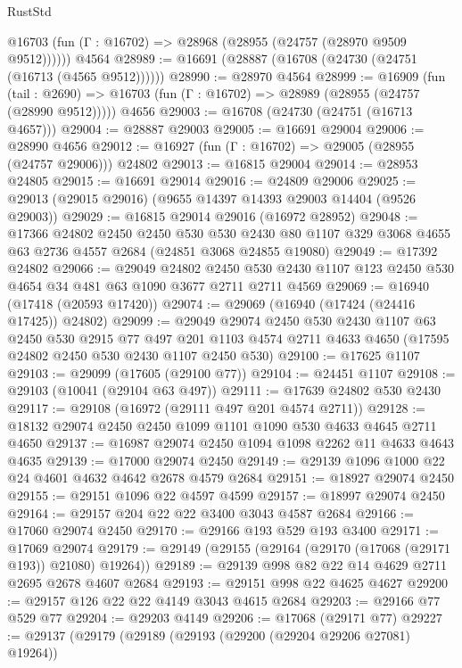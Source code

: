 \begin{lexlean}{RustStd}
\begin{coremodule}
      @16703 (fun (Γ : @16702) => @28968 (@28955 (@24757 (@28970 @9509 @9512))))))
    @4564
@28989 := @16691 (@28887 (@16708 (@24730 (@24751 (@16713 (@4565 @9512))))))
@28990 := @28970 @4564
@28999 := @16909
    (fun (tail : @2690) => @16703 (fun (Γ : @16702) => @28989 (@28955 (@24757 (@28990 @9512)))))
    @4656
@29003 := @16708 (@24730 (@24751 (@16713 @4657)))
@29004 := @28887 @29003
@29005 := @16691 @29004
@29006 := @28990 @4656
@29012 := @16927 (fun (Γ : @16702) => @29005 (@28955 (@24757 @29006))) @24802
@29013 := @16815 @29004
@29014 := @28953 @24805
@29015 := @16691 @29014
@29016 := @24809 @29006
@29025 := @29013 (@29015 @29016) (@9655 @14397 @14393 @29003 @14404 (@9526 @29003))
@29029 := @16815 @29014 @29016 (@16972 @28952)
@29048 := @17366
    @24802
    @2450
    @2450
    @530
    @530
    @2430
    @80
    @1107
    @329
    @3068
    @4655
    @63
    @2736
    @4557
    @2684
    (@24851 @3068 @24855 @19080)
@29049 := @17392 @24802
@29066 := @29049
    @24802
    @2450
    @530
    @2430
    @1107
    @123
    @2450
    @530
    @4654
    @34
    @481
    @63
    @1090
    @3677
    @2711
    @2711
    @4569
@29069 := @16940 (@17418 (@20593 @17420))
@29074 := @29069 (@16940 (@17424 (@24416 @17425)) @24802)
@29099 := @29049
    @29074
    @2450
    @530
    @2430
    @1107
    @63
    @2450
    @530
    @2915
    @77
    @497
    @201
    @1103
    @4574
    @2711
    @4633
    @4650
    (@17595 @24802 @2450 @530 @2430 @1107 @2450 @530)
@29100 := @17625 @1107
@29103 := @29099 (@17605 (@29100 @77))
@29104 := @24451 @1107
@29108 := @29103 (@10041 (@29104 @63 @497))
@29111 := @17639 @24802 @530 @2430
@29117 := @29108 (@16972 (@29111 @497 @201 @4574 @2711))
@29128 := @18132 @29074 @2450 @2450 @1099 @1101 @1090 @530 @4633 @4645 @2711 @4650
@29137 := @16987 @29074 @2450 @1094 @1098 @2262 @11 @4633 @4643 @4635
@29139 := @17000 @29074 @2450
@29149 := @29139 @1096 @1000 @22 @24 @4601 @4632 @4642 @2678 @4579 @2684
@29151 := @18927 @29074 @2450
@29155 := @29151 @1096 @22 @4597 @4599
@29157 := @18997 @29074 @2450
@29164 := @29157 @204 @22 @22 @3400 @3043 @4587 @2684
@29166 := @17060 @29074 @2450
@29170 := @29166 @193 @529 @193 @3400
@29171 := @17069 @29074
@29179 := @29149 (@29155 (@29164 (@29170 (@17068 (@29171 @193)) @21080) @19264))
@29189 := @29139 @998 @82 @22 @14 @4629 @2711 @2695 @2678 @4607 @2684
@29193 := @29151 @998 @22 @4625 @4627
@29200 := @29157 @126 @22 @22 @4149 @3043 @4615 @2684
@29203 := @29166 @77 @529 @77
@29204 := @29203 @4149
@29206 := @17068 (@29171 @77)
@29227 := @29137
    (@29179
      (@29189
        (@29193 (@29200 (@29204 @29206 @27081) @19264))

\end{coremodule}
\end{lexlean}
